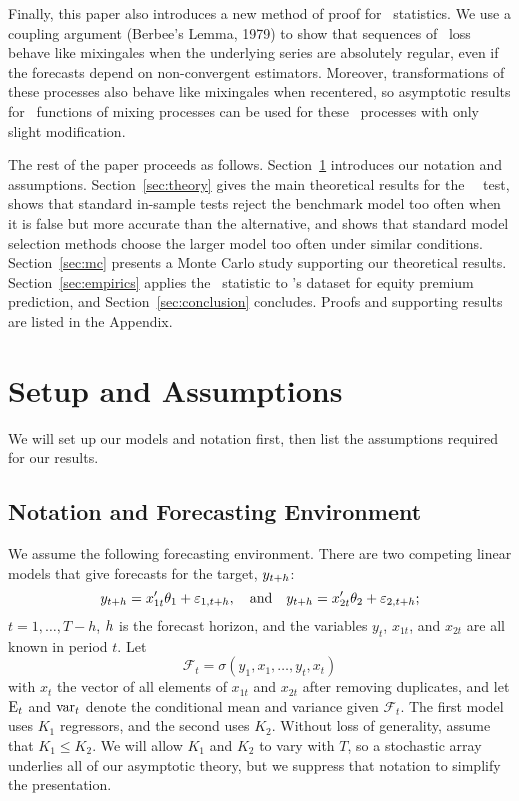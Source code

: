 \documentclass[11pt]{article}
\newcommand{\e}{\varepsilon}
\newcommand{\citepos}[1]{\citeauthor{#1}'s \citeyearpar{#1}}
\begin{document}
Finally, this paper also introduces a new method of proof for \oos\
statistics.  We use a coupling argument (Berbee's Lemma, 1979) to show
that sequences of \oos\ loss behave like mixingales when the
underlying series are absolutely regular, even if the forecasts depend
on non-convergent estimators.  Moreover, transformations of these
processes also behave like mixingales when recentered, so asymptotic
results for \ned\ functions of mixing processes can be used for these
\oos\ processes with only slight modification.

The rest of the paper proceeds as follows.
Section~\ref{sec:assumptions} introduces our notation and assumptions.
Section~\ref{sec:theory} gives the main theoretical results for the
\dmw\ \oos\ test, shows that standard in-sample tests reject the
benchmark model too often when it is false but more accurate than the
alternative, and shows that standard model selection methods choose the
larger model too often under similar conditions. Section~\ref{sec:mc}
presents a Monte Carlo study supporting our theoretical results.
Section~\ref{sec:empirics} applies the \oos\ statistic to
\citepos{GoW:08} dataset for equity premium prediction, and
Section~\ref{sec:conclusion} concludes.  Proofs and supporting results
are listed in the Appendix.

\section{Setup and Assumptions}\label{sec:assumptions}
We will set up our models and notation first, then list the assumptions
required for our results.

\subsection{Notation and Forecasting Environment}
We assume the following forecasting environment. There are two
competing linear models that give forecasts for the target,
$y_{t+h}$:
\[
y_{t+\h} = x_{1t}'\theta_1 + \e_{1,t+h}, \quad\text{and}\quad
y_{t+\h} = x_{2t}'\theta_2 + \e_{2,t+h};
\]
$t = 1,\dots,T-h$, $h$ is the forecast horizon, and the
variables $y_t$, $x_{1t}$, and $x_{2t}$ are all known in period $t$.
Let
\begin{equation*}
  \mathcal{F}_t = \sigma(y_1, x_1, \dots, y_t, x_t)
\end{equation*}
with $x_t$ the vector of all elements of $x_{1t}$ and $x_{2t}$ after
removing duplicates, and let $\operatorname{E}_t$ and $\operatorname{var}_t$ denote the
conditional mean and variance given $\mathcal{F}_t$.  The first model
uses $K_1$ regressors, and the second uses $K_2$.  Without loss of
generality, assume that $K_1 \leq K_2$.  We will allow $K_1$ and $K_2$
to vary with $T$, so a stochastic array underlies all of our
asymptotic theory, but we suppress that notation to simplify the
presentation.
\end{document}
